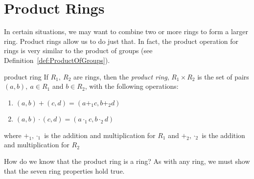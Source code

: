 \section{Product Rings}
\label{sec:Rings:ProductRings}

In certain situations, we may want to combine two or more rings to form a larger ring. Product rings allow us to do just that. In fact, the product operation for rings is very similar to the product of groups (see Definition~\ref{def:ProductOfGroups}).

\begin{defn}{product ring}
If $R_1,~R_2$ are rings, then the \emph{product ring}, $R_1\times R_2$ is the set of pairs $(a,b),~a\in R_1$ and $b\in R_2$, with the following operations:
\begin{enumerate}
\item $(a,b)+(c,d)=(a+_1c,b+_2d)$
\item $(a,b)\cdot(c,d)=(a\cdot_1c,b\cdot_2d)$
\end{enumerate}
where $+_1,\cdot_1$ is the addition and multiplication for $R_1$ and $+_2,\cdot_2$ is the addition and multiplication for $R_2$\\
\end{defn}
How do we know that the product ring is a ring? As with any ring, we must show that the seven ring properties hold true.


